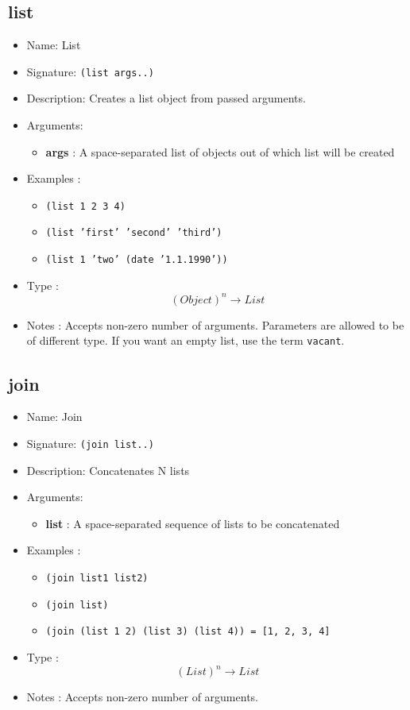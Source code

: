 \subsection{list}
\begin{itemize}
    \item Name: List
    \item Signature: \texttt{(list args..)}
    \item Description: Creates a list object from passed arguments.
    \item Arguments:
        \begin{itemize}
            \item \textbf{args} : A space-separated list of objects out of which list will be created
        \end{itemize}
    \item Examples :
        \begin{itemize}
            \item \texttt{(list 1 2 3 4)}
            \item \texttt{(list 'first' 'second' 'third')}
            \item \texttt{(list 1 'two' (date '1.1.1990'))}
        \end{itemize}
    \item Type : \[(Object)^n \to List\]
    \item Notes : Accepts non-zero number of arguments. Parameters are allowed to be of different type. If you want an empty list, use the term \texttt{vacant}.
\end{itemize}

\subsection{join}
\begin{itemize}
    \item Name: Join
    \item Signature: \texttt{(join list..)}
    \item Description: Concatenates N lists
    \item Arguments:
        \begin{itemize}
            \item \textbf{list} : A space-separated sequence of lists to be concatenated
        \end{itemize}
    \item Examples :
        \begin{itemize}
            \item \texttt{(join list1 list2)}
            \item \texttt{(join list)}
            \item \texttt{(join (list 1 2) (list 3) (list 4)) = [1, 2, 3, 4]}
        \end{itemize}
    \item Type : \[(List)^n \to List\]
    \item Notes : Accepts non-zero number of arguments.
\end{itemize}

